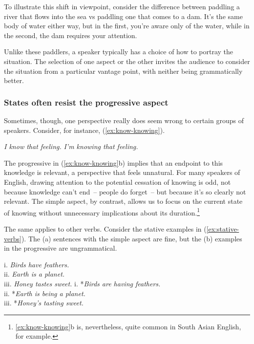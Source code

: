 To illustrate this shift in viewpoint, consider the difference between paddling a river that flows into the sea vs paddling one that comes to a dam. It's the same body of water either way, but in the first, you're aware only of the water, while in the second, the dam requires your attention.

Unlike these paddlers, a speaker typically has a choice of how to portray the situation. The selection of one aspect or the other invites the audience to consider the situation from a particular vantage point, with neither being grammatically better.

\subsubsection{States often resist the progressive aspect}\label{sec:statives-resist}
Sometimes, though, one perspective really does seem wrong to certain groups of speakers. Consider, for instance, (\ref{ex:know-knowing}).

\ea \label{ex:know-knowing}
\ea \textit{I know that feeling.}
\ex *\textit{I'm knowing that feeling.}
\z\z

The progressive in (\ref{ex:know-knowing}b) implies that an endpoint to this knowledge is relevant, a perspective that feels unnatural. For many speakers of English, drawing attention to the potential cessation of knowing is odd, not because knowledge can't end~-- people do forget~-- but because it's so clearly not relevant. The simple aspect, by contrast, allows us to focus on the current state of knowing without unnecessary implications about its duration.\footnote{\ref{ex:know-knowing}b is, nevertheless, quite common in South Asian English, for example.}

The same applies to other verbs. Consider the stative examples in (\ref{ex:stative-verbs}). The (a) sentences with the simple aspect are fine, but the (b) examples in the progressive are ungrammatical.

\ea\label{ex:stative-verbs}
\ea \textnormal{i.} \textit{Birds have feathers.} \\ \textnormal{ii.} \textit{Earth is a planet.} \\ \textnormal{iii.} \textit{Honey tastes sweet.}
\ex \textnormal{i.} *\textit{Birds are having feathers.} \\ \textnormal{ii.} *\textit{Earth is being a planet.} \\ \textnormal{iii.} *\textit{Honey's tasting sweet.}
\z\z

